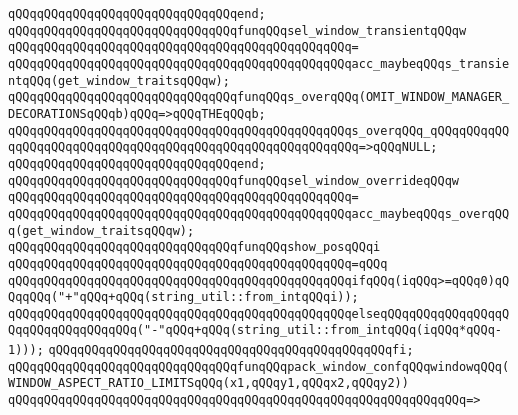 \verb|qQQqqQQqqQQqqQQqqQQqqQQqqQQqqQQqend;|\newline
\newline
\verb|qQQqqQQqqQQqqQQqqQQqqQQqqQQqqQQqfunqQQqsel_window_transientqQQqw|\newline
\verb|qQQqqQQqqQQqqQQqqQQqqQQqqQQqqQQqqQQqqQQqqQQqqQQq=|\newline
\verb|qQQqqQQqqQQqqQQqqQQqqQQqqQQqqQQqqQQqqQQqqQQqqQQqacc_maybeqQQqs_transientqQQq(get_window_traitsqQQqw);|\newline
\newline
\verb|qQQqqQQqqQQqqQQqqQQqqQQqqQQqqQQqfunqQQqs_overqQQq(OMIT_WINDOW_MANAGER_DECORATIONSqQQqb)qQQq=>qQQqTHEqQQqb;|\newline
\verb|qQQqqQQqqQQqqQQqqQQqqQQqqQQqqQQqqQQqqQQqqQQqqQQqs_overqQQq_qQQqqQQqqQQqqQQqqQQqqQQqqQQqqQQqqQQqqQQqqQQqqQQqqQQqqQQqqQQq=>qQQqNULL;|\newline
\verb|qQQqqQQqqQQqqQQqqQQqqQQqqQQqqQQqend;|\newline
\newline
\verb|qQQqqQQqqQQqqQQqqQQqqQQqqQQqqQQqfunqQQqsel_window_overrideqQQqw|\newline
\verb|qQQqqQQqqQQqqQQqqQQqqQQqqQQqqQQqqQQqqQQqqQQqqQQq=|\newline
\verb|qQQqqQQqqQQqqQQqqQQqqQQqqQQqqQQqqQQqqQQqqQQqqQQqacc_maybeqQQqs_overqQQq(get_window_traitsqQQqw);|\newline
\newline
\newline
\newline
\verb|qQQqqQQqqQQqqQQqqQQqqQQqqQQqqQQqfunqQQqshow_posqQQqi|\newline
\verb|qQQqqQQqqQQqqQQqqQQqqQQqqQQqqQQqqQQqqQQqqQQqqQQq=qQQq|\newline
\verb|qQQqqQQqqQQqqQQqqQQqqQQqqQQqqQQqqQQqqQQqqQQqqQQqifqQQq(iqQQq>=qQQq0)qQQqqQQq("+"qQQq+qQQq(string_util::from_intqQQqi));|\newline
\verb|qQQqqQQqqQQqqQQqqQQqqQQqqQQqqQQqqQQqqQQqqQQqqQQqelseqQQqqQQqqQQqqQQqqQQqqQQqqQQqqQQqqQQq("-"qQQq+qQQq(string_util::from_intqQQq(iqQQq*qQQq-1)));|\newline
\verb|qQQqqQQqqQQqqQQqqQQqqQQqqQQqqQQqqQQqqQQqqQQqqQQqfi;|\newline
\newline
\verb|qQQqqQQqqQQqqQQqqQQqqQQqqQQqqQQqfunqQQqpack_window_confqQQqwindowqQQq(WINDOW_ASPECT_RATIO_LIMITSqQQq(x1,qQQqy1,qQQqx2,qQQqy2))|\newline
\verb|qQQqqQQqqQQqqQQqqQQqqQQqqQQqqQQqqQQqqQQqqQQqqQQqqQQqqQQqqQQqqQQq=>|\newline
